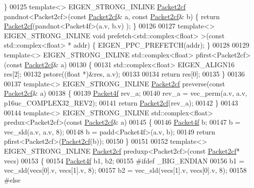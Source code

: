 \begin{DoxyCode}
      \}
00125 \textcolor{keyword}{template}<> EIGEN\_STRONG\_INLINE \hyperlink{struct_eigen_1_1internal_1_1_packet2cf}{Packet2cf} pandnot<Packet2cf>(\textcolor{keyword}{const} 
      \hyperlink{struct_eigen_1_1internal_1_1_packet2cf}{Packet2cf}& a, \textcolor{keyword}{const} \hyperlink{struct_eigen_1_1internal_1_1_packet2cf}{Packet2cf}& b) \{ \textcolor{keywordflow}{return} \hyperlink{struct_eigen_1_1internal_1_1_packet2cf}{Packet2cf}(pandnot<Packet4f>(a.v, b.v)
      ); \}
00126 
00127 \textcolor{keyword}{template}<> EIGEN\_STRONG\_INLINE \textcolor{keywordtype}{void} prefetch<std::complex<float> >(\textcolor{keyword}{const} std::complex<float> * addr)    \{ 
      EIGEN\_PPC\_PREFETCH(addr); \}
00128 
00129 \textcolor{keyword}{template}<> EIGEN\_STRONG\_INLINE std::complex<float>  pfirst<Packet2cf>(\textcolor{keyword}{const} 
      \hyperlink{struct_eigen_1_1internal_1_1_packet2cf}{Packet2cf}& a)
00130 \{
00131   std::complex<float> EIGEN\_ALIGN16 res[2];
00132   pstore((\textcolor{keywordtype}{float} *)&res, a.v);
00133 
00134   \textcolor{keywordflow}{return} res[0];
00135 \}
00136 
00137 \textcolor{keyword}{template}<> EIGEN\_STRONG\_INLINE \hyperlink{struct_eigen_1_1internal_1_1_packet2cf}{Packet2cf} preverse(\textcolor{keyword}{const} \hyperlink{struct_eigen_1_1internal_1_1_packet2cf}{Packet2cf}& a)
00138 \{
00139   \hyperlink{struct_eigen_1_1internal_1_1_packet4f}{Packet4f} rev\_a;
00140   rev\_a = vec\_perm(a.v, a.v, p16uc\_COMPLEX32\_REV2);
00141   \textcolor{keywordflow}{return} \hyperlink{struct_eigen_1_1internal_1_1_packet2cf}{Packet2cf}(rev\_a);
00142 \}
00143 
00144 \textcolor{keyword}{template}<> EIGEN\_STRONG\_INLINE std::complex<float> predux<Packet2cf>(\textcolor{keyword}{const} 
      \hyperlink{struct_eigen_1_1internal_1_1_packet2cf}{Packet2cf}& a)
00145 \{
00146   \hyperlink{struct_eigen_1_1internal_1_1_packet4f}{Packet4f} b;
00147   b = vec\_sld(a.v, a.v, 8);
00148   b = padd<Packet4f>(a.v, b);
00149   \textcolor{keywordflow}{return} pfirst<Packet2cf>(\hyperlink{struct_eigen_1_1internal_1_1_packet2cf}{Packet2cf}(b));
00150 \}
00151 
00152 \textcolor{keyword}{template}<> EIGEN\_STRONG\_INLINE \hyperlink{struct_eigen_1_1internal_1_1_packet2cf}{Packet2cf} preduxp<Packet2cf>(\textcolor{keyword}{const} 
      \hyperlink{struct_eigen_1_1internal_1_1_packet2cf}{Packet2cf}* vecs)
00153 \{
00154   \hyperlink{struct_eigen_1_1internal_1_1_packet4f}{Packet4f} b1, b2;
00155 \textcolor{preprocessor}{#ifdef \_BIG\_ENDIAN  }
00156   b1 = vec\_sld(vecs[0].v, vecs[1].v, 8);
00157   b2 = vec\_sld(vecs[1].v, vecs[0].v, 8);
00158 \textcolor{preprocessor}{#else}

\end{DoxyCode}
